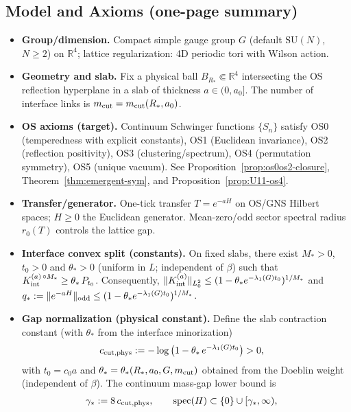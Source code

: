 \documentclass[11pt]{amsart}
\theoremstyle{plain}
\theoremstyle{definition}
\theoremstyle{remark}
\newcommand{\spec}{\operatorname{spec}}
\begin{document}
\subsection*{Model and Axioms (one-page summary)}
\begin{itemize}[leftmargin=2em, itemsep=8pt, parsep=4pt]
  \item \textbf{Group/dimension.} Compact simple gauge group $G$ (default $\mathrm{SU}(N)$, $N\ge 2$) on $\mathbb R^4$; lattice regularization: 4D periodic tori with Wilson action.
  \item \textbf{Geometry and slab.} Fix a physical ball $B_{R_*}\Subset\mathbb R^4$ intersecting the OS reflection hyperplane in a slab of thickness $a\in(0,a_0]$. The number of interface links is $m_{\rm cut}=m_{\rm cut}(R_*,a_0)$.
  \item \textbf{OS axioms (target).} Continuum Schwinger functions $\{S_n\}$ satisfy OS0 (temperedness with explicit constants), OS1 (Euclidean invariance), OS2 (reflection positivity), OS3 (clustering/spectrum), OS4 (permutation symmetry), OS5 (unique vacuum). See Proposition~\ref{prop:os0os2-closure}, Theorem~\ref{thm:emergent-sym}, and Proposition~\ref{prop:U11-os4}.
  \item \textbf{Transfer/generator.} One-tick transfer $T=e^{-aH}$ on OS/GNS Hilbert spaces; $H\ge 0$ the Euclidean generator. Mean-zero/odd sector spectral radius $r_0(T)$ controls the lattice gap.
  \item \textbf{Interface convex split (constants).} On fixed slabs, there exist $M_*>0$, $t_0>0$ and $\theta_*>0$ (uniform in $L$; independent of $\beta$) such that $K_{\rm int}^{(a)\,\circ M_*}\ge \theta_*\, P_{t_0}$. Consequently, $\|K_{\rm int}^{(a)}\|_{L^2_0}\le (1-\theta_* e^{-\lambda_1(G) t_0})^{1/M_*}$ and $q_*:=\|e^{-aH}\|_{\rm odd}\le (1-\theta_* e^{-\lambda_1(G) t_0})^{1/M_*}$.
  \item \textbf{Gap normalization (physical constant).} Define the slab contraction constant (with $\theta_*$ from the interface minorization)
  \begin{align}
    c_{\rm cut,phys} &:= -\log\big(1-\theta_*\, e^{-\lambda_1(G) t_0}\big) > 0,
  \end{align}
  with $t_0=c_0 a$ and $\theta_*=\theta_*(R_*,a_0,G,m_{\rm cut})$ obtained from the Doeblin weight (independent of $\beta$). The continuum mass-gap lower bound is
  \begin{align}
    \gamma_* &:= 8\,c_{\rm cut,phys}, \qquad \spec(H)\subset\{0\}\cup[\gamma_*,\infty),
  \end{align}

\end{itemize}
\end{document}
